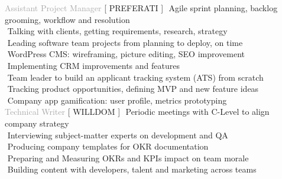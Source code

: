 
    
\begin{cvtable}

% 

{\textcolor{darkgray}{Assistant Project Manager}}%
{[ {P\scriptsize REFERATI} ]}%
{%
     \textperiodcentered $ $ Agile sprint planning, backlog grooming, workflow and resolution \\
     \textperiodcentered $ $ Talking with clients, getting requirements, research, strategy \\ %
     \textperiodcentered $ $ Leading software team projects from planning to deploy, on time \\
     \textperiodcentered $ $ WordPress CMS: wireframing, picture editing, SEO improvement \\
     \textperiodcentered $ $ Implementing CRM improvements and features \\
     \textperiodcentered $ $ Team leader to build an applicant tracking system (ATS) from scratch\\
     \textperiodcentered $ $ Tracking product opportunities, defining MVP and new feature ideas \\
     \textperiodcentered $ $ Company app gamification: user profile, metrics prototyping
     \\
} 
% 
% 
{\textcolor{darkgray}{%
    Technical Writer
    }}%
{[ {W\scriptsize ILL}{D\scriptsize OM} ]}%
{%
    \textperiodcentered $ $ Periodic meetings with C-Level to align company strategy  \\
    \textperiodcentered $ $ Interviewing subject-matter experts on development and QA \\
    \textperiodcentered $ $ Producing company templates for OKR documentation \\
    \textperiodcentered $ $ Preparing and Measuring OKRs and KPIs impact on team morale \\
    \textperiodcentered $ $ Building content with developers, talent and marketing across teams 
} 


\end{cvtable}
